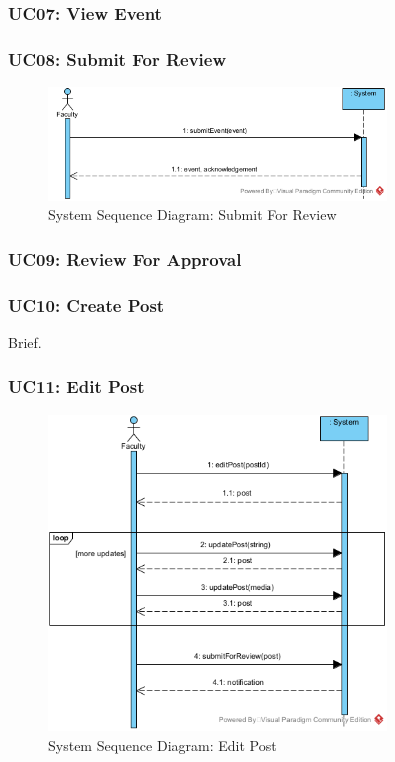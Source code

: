 \documentclass{article}
\begin{document}
\subsubsection{UC07: View Event}
\subsubsection{UC08: Submit For Review}
\begin{figure}[H]
    \centering
    \includegraphics[width=0.8\textwidth]{images/SSD-UC08-SubmitForReview.png}
    \centering
    \caption{System Sequence Diagram: Submit For Review}
\end{figure}
\subsubsection{UC09: Review For Approval}
\subsubsection{UC10: Create Post}
Brief.
\subsubsection{UC11: Edit Post}
\begin{figure}[H]
    \centering
    \includegraphics[width=0.8\textwidth]{images/SSD-UC11-EditPost.png}
    \centering
    \caption{System Sequence Diagram: Edit Post}
\end{figure}
\end{document}
